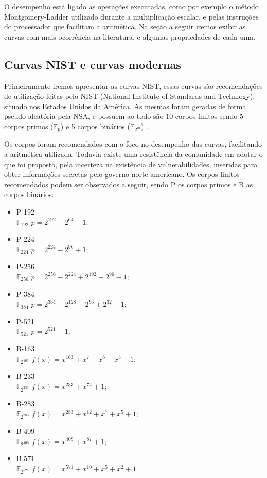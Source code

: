 O desempenho está ligado as operações executadas, como por exemplo o método Montgomery-Ladder utilizado durante a multiplicação escalar, e pelas instruções do processador que facilitam a aritmética. Na seção a seguir iremos exibir as curvas com mais ocorrência na literatura, e algumas propriedades de cada uma.

\subsection{Curvas NIST e curvas modernas}
Primeiramente iremos apresentar as curvas NIST, essas curvas são recomendações de utilização feitas pelo NIST (National Institute of Standards and Technlogy), situado nos Estados Unidos da América. As mesmas foram geradas de forma pseudo-aleatória pela NSA, e possuem ao todo são 10 corpos finitos sendo 5 corpos primos ($\mathbb{F}_p$) e 5 corpos binários ($\mathbb{F}_{2^m}$) \cite{Brown2001}.

Os corpos foram recomendados com o foco no desempenho das curvas, facilitando a aritmética utilizada. Todavia existe uma resistência da comunidade em adotar o que foi proposto, pela incerteza na existência de vulnerabilidades, inseridas para obter informações secretas pelo governo norte americano. Os corpos finitos recomendados podem ser observados a seguir, sendo P os corpos primos e B as corpos binários:

\begin{multicols}{2}
\begin{itemize}
\item P-192 \\ $\mathbb{F}_{192}$ $p = 2^{192} - 2^{64} - 1$; 
\item P-224 \\ $\mathbb{F}_{224}$ $p = 2^{224} - 2^{96} + 1$;
\item P-256 \\ $\mathbb{F}_{256}$ $p = 2^{256} - 2^{224} + 2^{192} + 2^{96} - 1$;
\item P-384 \\ $\mathbb{F}_{384}$ $p = 2^{384} - 2^{128} - 2^{96} + 2^{32} - 1$;
\item P-521 \\ $\mathbb{F}_{521}$ $p = 2^{521} - 1$;
\item B-163 \\ $\mathbb{F}_{2^{163}}$ $f(x) = x^{163} + x^7 + x^6 + x^3 + 1$;
\item B-233 \\ $\mathbb{F}_{2^{233}}$ $f(x) = x^{233} + x^{74} + 1$;
\item B-283 \\ $\mathbb{F}_{2^{283}}$ $f(x) = x^{283} + x^{12} + x^7 + x^5 + 1$;
\item B-409 \\ $\mathbb{F}_{2^{409}}$ $f(x) = x^{409} + x ^{87} + 1$;
\item B-571 \\ $\mathbb{F}_{2^{571}}$ $f(x) = x^{571} + x^{10} + x^5 + x^2 + 1$.
\end{itemize}
\end{multicols}

